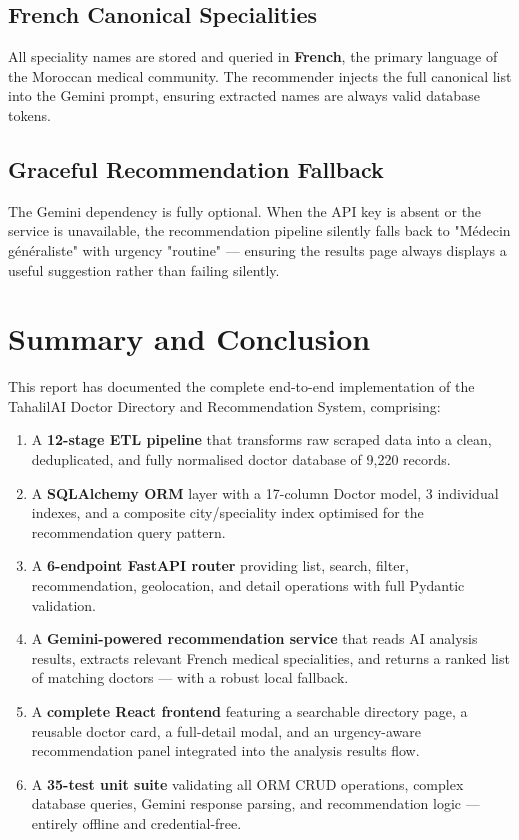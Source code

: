 \documentclass[12pt, a4paper]{article}
\begin{document}
\subsection{French Canonical Specialities}

All speciality names are stored and queried in \textbf{French},
the primary language of the Moroccan medical community.
The recommender injects the full canonical list into the Gemini
prompt, ensuring extracted names are always valid database tokens.

\subsection{Graceful Recommendation Fallback}

The Gemini dependency is fully optional. When the API key is absent
or the service is unavailable, the recommendation pipeline silently
falls back to "Médecin généraliste" with urgency "routine" — ensuring
the results page always displays a useful suggestion rather than
failing silently.

\section{Summary and Conclusion}

This report has documented the complete end-to-end implementation of the
TahalilAI Doctor Directory and Recommendation System, comprising:

\begin{enumerate}[leftmargin=*, itemsep=5pt]
  \item A \textbf{12-stage ETL pipeline} that transforms raw scraped data
        into a clean, deduplicated, and fully normalised doctor database
        of 9,220 records.
  \item A \textbf{SQLAlchemy ORM} layer with a 17-column Doctor model,
        3 individual indexes, and a composite city/speciality index
        optimised for the recommendation query pattern.
  \item A \textbf{6-endpoint FastAPI router} providing list, search,
        filter, recommendation, geolocation, and detail operations
        with full Pydantic validation.
  \item A \textbf{Gemini-powered recommendation service} that reads
        AI analysis results, extracts relevant French medical specialities,
        and returns a ranked list of matching doctors — with a robust
        local fallback.
  \item A \textbf{complete React frontend} featuring a searchable
        directory page, a reusable doctor card, a full-detail modal,
        and an urgency-aware recommendation panel integrated into the
        analysis results flow.
  \item A \textbf{35-test unit suite} validating all ORM CRUD operations,
        complex database queries, Gemini response parsing, and recommendation
        logic — entirely offline and credential-free.
\end{enumerate}
\end{document}
